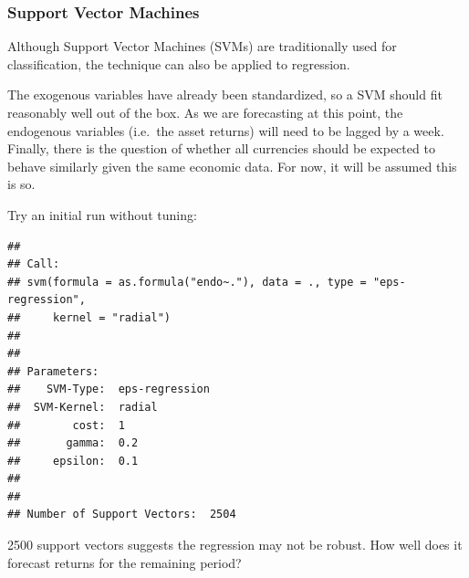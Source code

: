 \documentclass[]{article}
\newenvironment{Shaded}{\begin{snugshade}}{\end{snugshade}}
\newcommand{\KeywordTok}[1]{\textcolor[rgb]{0.13,0.29,0.53}{\textbf{#1}}}
\newcommand{\DataTypeTok}[1]{\textcolor[rgb]{0.13,0.29,0.53}{#1}}
\newcommand{\StringTok}[1]{\textcolor[rgb]{0.31,0.60,0.02}{#1}}
\newcommand{\CommentTok}[1]{\textcolor[rgb]{0.56,0.35,0.01}{\textit{#1}}}
\newcommand{\OperatorTok}[1]{\textcolor[rgb]{0.81,0.36,0.00}{\textbf{#1}}}
\newcommand{\NormalTok}[1]{#1}
\begin{document}
\subsubsection{Support Vector Machines}\label{support-vector-machines}

Although Support Vector Machines (SVMs) are traditionally used for
classification, the technique can also be applied to regression.

The exogenous variables have already been standardized, so a SVM should
fit reasonably well out of the box. As we are forecasting at this point,
the endogenous variables (i.e.~the asset returns) will need to be lagged
by a week. Finally, there is the question of whether all currencies
should be expected to behave similarly given the same economic data. For
now, it will be assumed this is so.

Try an initial run without tuning:

\begin{Shaded}
\end{Shaded}

\begin{verbatim}
## 
## Call:
## svm(formula = as.formula("endo~."), data = ., type = "eps-regression", 
##     kernel = "radial")
## 
## 
## Parameters:
##    SVM-Type:  eps-regression 
##  SVM-Kernel:  radial 
##        cost:  1 
##       gamma:  0.2 
##     epsilon:  0.1 
## 
## 
## Number of Support Vectors:  2504
\end{verbatim}

2500 support vectors suggests the regression may not be robust. How well
does it forecast returns for the remaining period?
\end{document}
